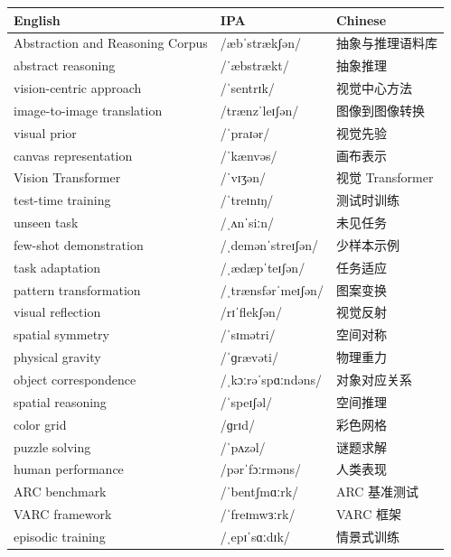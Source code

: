\documentclass[UTF8,12pt,a4paper]{ctexart}
\providecommand{\zh}[1]{#1}
\begin{document}
\begin{tabular*}{\textwidth}{@{\extracolsep{\fill}}lll@{}}
\toprule
\textbf{English} & \textbf{IPA} & \textbf{Chinese} \\
\midrule
Abstraction and Reasoning Corpus & {\ipafont /æbˈstrækʃən/} & \zh{抽象与推理语料库} \\
abstract reasoning & {\ipafont /ˈæbstrækt/} & \zh{抽象推理} \\
vision-centric approach & {\ipafont /ˈsentrɪk/} & \zh{视觉中心方法} \\
image-to-image translation & {\ipafont /trænzˈleɪʃən/} & \zh{图像到图像转换} \\
visual prior & {\ipafont /ˈpraɪər/} & \zh{视觉先验} \\
canvas representation & {\ipafont /ˈkænvəs/} & \zh{画布表示} \\
Vision Transformer & {\ipafont /ˈvɪʒən/} & \zh{视觉 Transformer} \\
test-time training & {\ipafont /ˈtreɪnɪŋ/} & \zh{测试时训练} \\
unseen task & {\ipafont /ˌʌnˈsiːn/} & \zh{未见任务} \\
few-shot demonstration & {\ipafont /ˌdemənˈstreɪʃən/} & \zh{少样本示例} \\
task adaptation & {\ipafont /ˌædæpˈteɪʃən/} & \zh{任务适应} \\
pattern transformation & {\ipafont /ˌtrænsfərˈmeɪʃən/} & \zh{图案变换} \\
visual reflection & {\ipafont /rɪˈflekʃən/} & \zh{视觉反射} \\
spatial symmetry & {\ipafont /ˈsɪmətri/} & \zh{空间对称} \\
physical gravity & {\ipafont /ˈɡrævəti/} & \zh{物理重力} \\
object correspondence & {\ipafont /ˌkɔːrəˈspɑːndəns/} & \zh{对象对应关系} \\
spatial reasoning & {\ipafont /ˈspeɪʃəl/} & \zh{空间推理} \\
color grid & {\ipafont /ɡrɪd/} & \zh{彩色网格} \\
puzzle solving & {\ipafont /ˈpʌzəl/} & \zh{谜题求解} \\
human performance & {\ipafont /pərˈfɔːrməns/} & \zh{人类表现} \\
ARC benchmark & {\ipafont /ˈbentʃmɑːrk/} & \zh{ARC 基准测试} \\
VARC framework & {\ipafont /ˈfreɪmwɜːrk/} & \zh{VARC 框架} \\
episodic training & {\ipafont /ˌepɪˈsɑːdɪk/} & \zh{情景式训练} \\

\end{tabular*}
\end{document}
